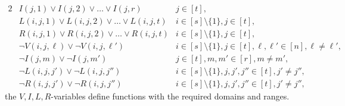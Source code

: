 \documentclass[10pt,a4paper]{article}
\theoremstyle{remark}
\newtheorem*{switching lemma}{Switching Lemma}
\newtheorem*{open problem}{Open Problem}
\theoremstyle{definition}
\begin{document}
\begin{alignat}{2}
\label{refclause:I-dom} & I(j,1) \lor I(j,2) \lor \ldots \lor I(j,r)  & j\! \in \! [t], \\
\label{refclause:L-dom} & L(i,j,1) \lor L(i,j,2) \lor \ldots \lor L(i,j,t)  & i \! \in \! [s] \! \setminus \! \{1\}, j\! \in \! [t], \\
\label{refclause:R-dom} & R(i,j,1) \lor R(i,j,2) \lor \ldots \lor R(i,j,t)  & i \! \in \! [s] \! \setminus \! \{1\}, j\! \in \! [t], \\
\label{refclause:V-func} & \neg V(i,j,\ell) \lor \neg V(i,j,\ell')  & i \! \in \! [s] \! \setminus \! \{1\}, j\! \in \! [t], \ell,\ell' \! \in \! [n], \ell \neq \ell',\\
\label{refclause:I-func} & \neg I(j,m) \lor \neg I(j,m')  &  j\! \in \! [t], m,m' \! \in \! [r], m \neq m',\\
\label{refclause:L-func} & \neg L(i,j,j') \lor \neg L(i,j,j'')  & i \! \in \! [s] \! \setminus \! \{1\}, j,j',j'' \! \in \! [t], j' \neq j'',\\
\label{refclause:R-func} & \neg R(i,j,j') \lor \neg R(i,j,j'')  & i \! \in \! [s] \! \setminus \! \{1\}, j,j',j'' \! \in \! [t], j' \neq j'', 
\end{alignat}
the $V,I,L,R$-variables define functions with the required domains and ranges.
\end{document}
